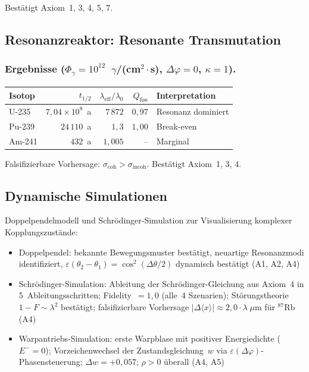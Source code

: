 \documentclass[a4paper,11pt]{article}
\begin{document}
	Best\"atigt Axiom~1, 3, 4, 5, 7.
	
	\subsection{Resonanzreaktor: Resonante Transmutation}
	
	\subsubsection{Ergebnisse
		($\Phi_\gamma = 10^{12}$~$\gamma$/(cm$^2 \cdot$s),
		$\Delta\varphi = 0$, $\kappa = 1$).}
	
	\begin{center}
		\begin{tabular}{lrrrl}
			\hline
			\textbf{Isotop} & $t_{1/2}$
			& $\lambda_{\mathrm{eff}}/\lambda_0$
			& $Q_{\mathrm{fiss}}$ & \textbf{Interpretation} \\
			\hline
			U-235 & $7{,}04 \times 10^8$~a & $7\,872$
			& $0{,}97$ & Resonanz dominiert \\
			Pu-239 & $24\,110$~a & $1{,}3$
			& $1{,}00$ & Break-even \\
			Am-241 & $432$~a & $1{,}005$
			& -- & Marginal \\
			\hline
		\end{tabular}
	\end{center}
	
	Falsifizierbare Vorhersage:
	$\sigma_{\mathrm{coh}} > \sigma_{\mathrm{incoh}}$.
	Best\"atigt Axiom~1, 3, 4.
	
	\subsection{Dynamische Simulationen}
	
	Doppelpendelmodell und Schr\"odinger-Simulation
	zur Visualisierung komplexer Kopplungszust\"ande:
	\begin{itemize}
		\item Doppelpendel: bekannte Bewegungsmuster
		best\"atigt, neuartige Resonanzmodi identifiziert,
		$\varepsilon(\theta_2-\theta_1) = \cos^2(\Delta\theta/2)$
		dynamisch best\"atigt (A1, A2, A4)
		\item Schr\"odinger-Simulation: Ableitung der
		Schr\"odinger-Gleichung aus Axiom~4 in
		5~Ableitungsschritten; Fidelity~$= 1{,}0$ (alle~4
		Szenarien); St\"orungstheorie
		$1-F \sim \lambda^2$ best\"atigt; falsifizierbare
		Vorhersage $|\Delta\langle x\rangle| \approx
		2{,}0 \cdot \lambda\;\mu$m f\"ur ${}^{87}$Rb (A4)
		\item Warpantriebs-Simulation: erste Warpblase mit
		positiver Energiedichte ($E^- = 0$);
		Vorzeichenwechsel der Zustandsgleichung~$w$ via
		$\varepsilon(\Delta\varphi)$-Phasensteuerung;
		$\Delta w = +0{,}057$; $\rho > 0$ \"uberall (A4, A5)
	\end{itemize}
	
\end{document}
